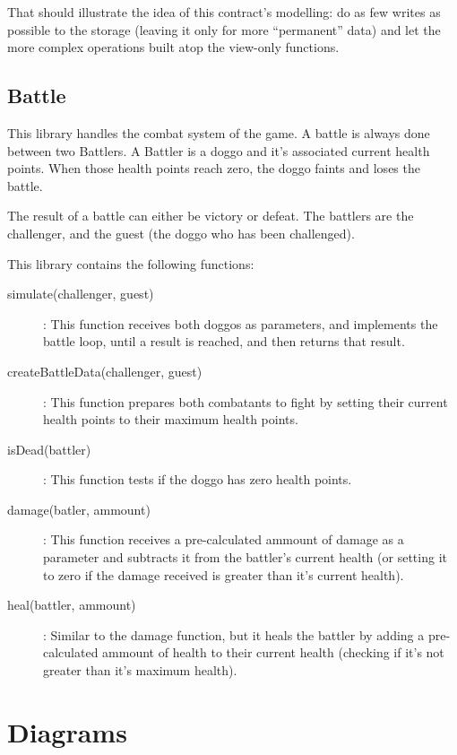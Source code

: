 \documentclass{article}
\begin{document}
    That should illustrate the idea of this contract's modelling: do as few
    writes as possible to the storage (leaving it only for more ``permanent''
    data) and let the more complex operations built atop the view-only
    functions.

    \subsection{Battle}

    This library handles the combat system of the game. A battle is always done
    between two Battlers. A Battler is a doggo and it's associated current
    health points. When those health points reach zero, the doggo faints and
    loses the battle.

    The result of a battle can either be victory or defeat. The battlers are
    the challenger, and the guest (the doggo who has been challenged).

    This library contains the following functions:
    \begin{description}
        \item[simulate(challenger, guest)]: This function receives both doggos
            as parameters, and implements the battle loop, until a result is
            reached, and then returns that result.
        \item[createBattleData(challenger, guest)]: This function prepares both
            combatants to fight by setting their current health points to their
            maximum health points.
        \item[isDead(battler)]: This function tests if the doggo has zero
            health points.
        \item[damage(batler, ammount)]: This function receives a pre-calculated
            ammount of damage as a parameter and subtracts it from the
            battler's current health (or setting it to zero if the damage
            received is greater than it's current health).  \item[heal(battler,
            ammount)]: Similar to the damage function, but it heals the battler
            by adding a pre-calculated ammount of health to their current
            health (checking if it's not greater than it's maximum health).
    \end{description}

    \section{Diagrams}
\end{document}
